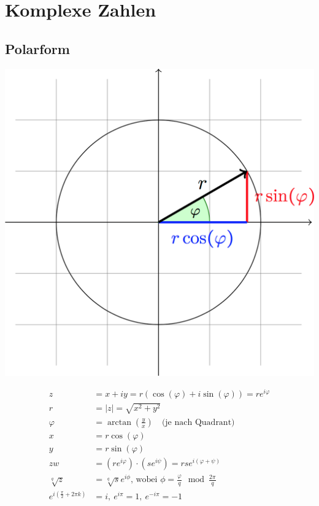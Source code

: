 \documentclass[11pt]{article}
\begin{document}
\section{Komplexe Zahlen}

\subsection{Polarform}

\begin{minipage}[c]{0.5\textwidth}
\centering
\includegraphics[width=\linewidth,keepaspectratio=true]{images/polarform}
\end{minipage}
%
\begin{minipage}[c]{0.5\textwidth}
\begin{equation*}
\begin{split}
	z & = x + iy = r(\cos(\varphi) + i\sin(\varphi)) = re^{i\varphi} \\
	r & = |z| = \sqrt{x^2 + y^2} \\
	\varphi & = \arctan(\frac{y}{x}) \quad \text{(je nach Quadrant)}  \\
	x & = r\cos(\varphi) \\
	y & = r\sin(\varphi) \\
	zw & = (re^{i\varphi})\cdot(se^{i\psi}) = rse^{i(\varphi + \psi)} \\
	\sqrt[q]{z} & = \sqrt[q]{s}e^{i\phi}\text{, wobei }\phi = \frac{\varphi}{q} \mod \frac{2\pi}{q} \\
	e^{i(\frac{\pi}{2} + 2\pi k)} & = i,\ e^{i\pi} = 1, \ e^{-i\pi} = -1
\end{split}
\end{equation*}
\end{minipage}
\end{document}
